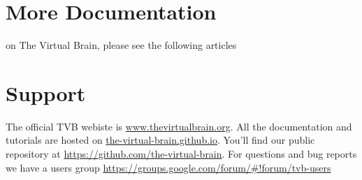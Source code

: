 \documentclass{tufte-handout}
\begin{document}
\section{More Documentation}\label{sec:more-doc}
 on The Virtual Brain, please see the following articles \citep{Sanz-Leon_2013, Spiegler_2013, Woodman_2014, Jirsa_2010b}


\section{Support}\label{sec:support}

The official TVB webiste is \url{www.thevirtualbrain.org}.  
All the documentation and tutorials are hosted on \url{the-virtual-brain.github.io}.
You'll find our public  repository at \url{https://github.com/the-virtual-brain}. 
For questions and bug reports we have a users group \url{https://groups.google.com/forum/#!forum/tvb-users}



\end{document}
